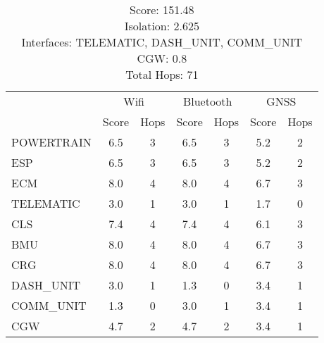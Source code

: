 \begin{table}[ht]
    \centering
    \caption{ \\ Score: 151.48 \\ Isolation: 2.625 \\ Interfaces: TELEMATIC, DASH\_UNIT, COMM\_UNIT \\ CGW: 0.8 \\ Total Hops: 71}
    \label{tab:arch10}
    \begin{tabular}{lcccccc}
    \hline
    & \multicolumn{2}{c}{Wifi} & \multicolumn{2}{c}{Bluetooth} & \multicolumn{2}{c}{GNSS} \\
    & Score & Hops & Score & Hops & Score & Hops \\
    \hline
        POWERTRAIN & 6.5 & 3 & 6.5 & 3 & 5.2 & 2 \\
        ESP & 6.5 & 3 & 6.5 & 3 & 5.2 & 2 \\
        ECM & 8.0 & 4 & 8.0 & 4 & 6.7 & 3 \\
        TELEMATIC & 3.0 & 1 & 3.0 & 1 & 1.7 & 0 \\
        CLS & 7.4 & 4 & 7.4 & 4 & 6.1 & 3 \\
        BMU & 8.0 & 4 & 8.0 & 4 & 6.7 & 3 \\
        CRG & 8.0 & 4 & 8.0 & 4 & 6.7 & 3 \\
        DASH\_UNIT & 3.0 & 1 & 1.3 & 0 & 3.4 & 1 \\
        COMM\_UNIT & 1.3 & 0 & 3.0 & 1 & 3.4 & 1 \\
        CGW & 4.7 & 2 & 4.7 & 2 & 3.4 & 1 \\
    \hline
    \end{tabular}
\end{table}